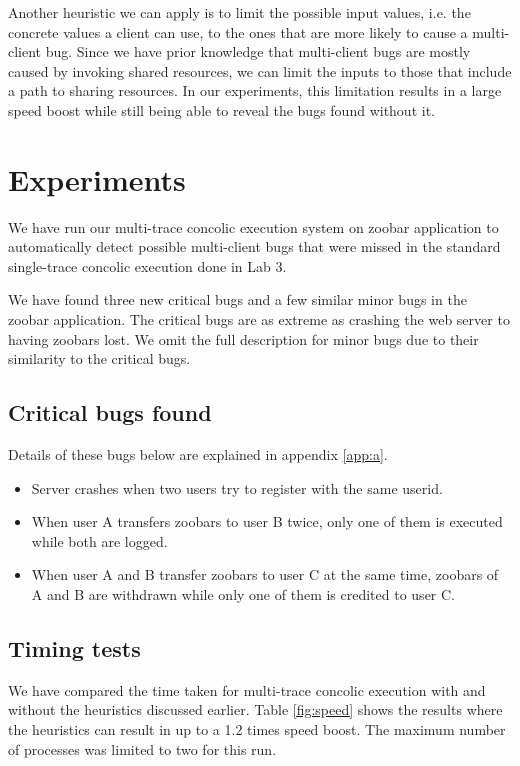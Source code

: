 \documentclass{llncs}
\begin{document}
Another heuristic we can apply is to limit the possible input values,
i.e. the concrete values a client can use, to the ones that are more
likely to cause a multi-client bug. Since we have prior knowledge that
multi-client bugs are mostly caused by invoking shared resources, we
can limit the inputs to those that include a path to sharing
resources. In our experiments, this limitation results in a large
speed boost while still being able to reveal the bugs found without
it.

\section{Experiments}

We have run our multi-trace concolic execution system on zoobar
application to automatically detect possible multi-client bugs that
were missed in the standard single-trace concolic execution done in
Lab 3.

We have found three new critical bugs and a few similar minor bugs in
the zoobar application. The critical bugs are as extreme as crashing
the web server to having zoobars lost. We omit the full description
for minor bugs due to their similarity to the critical bugs.

\subsection{Critical bugs found}

Details of these bugs below are explained in appendix \ref{app:a}.
\begin{itemize}
  \item Server crashes when two users try to register with the same
    userid.
  \item When user A transfers zoobars to user B twice, only one of
    them is executed while both are logged.
  \item When user A and B transfer zoobars to user C at the same time,
    zoobars of A and B are withdrawn while only one of them is
    credited to user C.
\end{itemize}

\subsection{Timing tests}

We have compared the time taken for multi-trace concolic execution
with and without the heuristics discussed earlier. Table
\ref{fig:speed} shows the results where the heuristics can result in
up to a 1.2 times speed boost. The maximum number of processes was
limited to two for this run.
\end{document}
